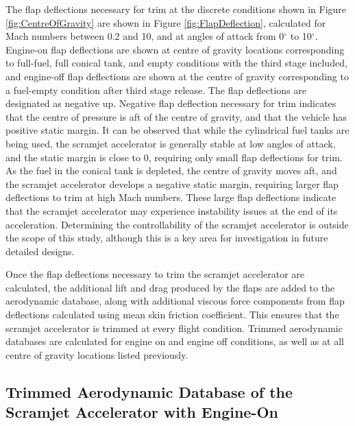 		The flap deflections necessary for trim at the discrete conditions shown in Figure \ref{fig:CentreOfGravity} are shown in Figure \ref{fig:FlapDeflection}, calculated for Mach numbers between 0.2 and 10, and at angles of attack from 0$^\circ$ to 10$^\circ$. Engine-on flap deflections are shown at centre of gravity locations corresponding to full-fuel, full conical tank, and empty conditions with the third stage included, and engine-off flap deflections are shown at the centre of gravity corresponding to a fuel-empty condition after third stage release. 
		The flap deflections are designated as negative up. Negative flap deflection necessary for trim indicates that the centre of pressure is aft of the centre of gravity, and that the vehicle has positive static margin.
		It can be observed that while the cylindrical fuel tanks are being used, the scramjet accelerator is generally stable at low angles of attack, and the static margin is close to 0, requiring only small flap deflections for trim. As the fuel in the conical tank is depleted, the centre of gravity moves aft, and the scramjet accelerator develops a negative static margin, requiring larger flap deflections to trim at high Mach numbers. These large flap deflections indicate that the scramjet accelerator may experience instability issues at the end of its acceleration. Determining the controllability of the scramjet accelerator is outside the scope of this study, although this is a key area for investigation in future detailed designs. 
		
		  Once the flap deflections necessary to trim the scramjet accelerator are calculated, the additional lift and drag produced by the flaps are added to the aerodynamic database, along with additional viscous force components from flap deflections calculated using mean skin friction coefficient. This ensures that the scramjet accelerator is trimmed at every flight condition.
		  Trimmed aerodynamic databases are calculated for engine on and engine off conditions, as well as at all centre of gravity locations listed previously. 
		
		
		
		
		
		
		
		\subsection{Trimmed Aerodynamic Database of the Scramjet Accelerator with Engine-On}\label{sec:trimmedongineon}

